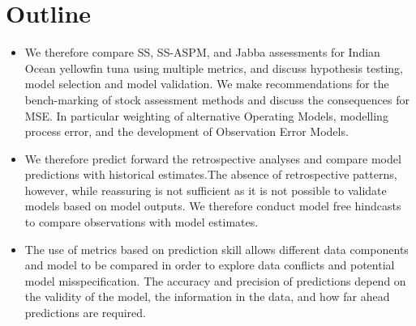 \documentclass[a4paper]{article}
\begin{document}
 \section*{Outline}
\begin{itemize}
    
    
    
    \item  We  therefore compare SS, SS-ASPM, and Jabba assessments for Indian Ocean yellowfin tuna  using multiple metrics, and discuss hypothesis testing, model selection and model validation. We make recommendations for the bench-marking of stock assessment methods and discuss the consequences for MSE. In particular weighting of alternative Operating Models, modelling process error, and the development of Observation Error Models.   

    
   \item We therefore predict forward the retrospective analyses and compare model predictions with historical estimates.The absence of retrospective patterns, however, while reassuring is not sufficient as it is not possible to validate models based on model outputs. We therefore conduct model free hindcasts to compare observations with model estimates. 
   
   \item The use of metrics based on prediction skill allows different data components and model to be compared in order to explore data conflicts and potential model misspecification. The accuracy and precision of predictions depend on the validity of the model, the information in the data, and how far ahead predictions are required. 
    
\end{itemize}

\newpage
\tableofcontents 
\end{document}
